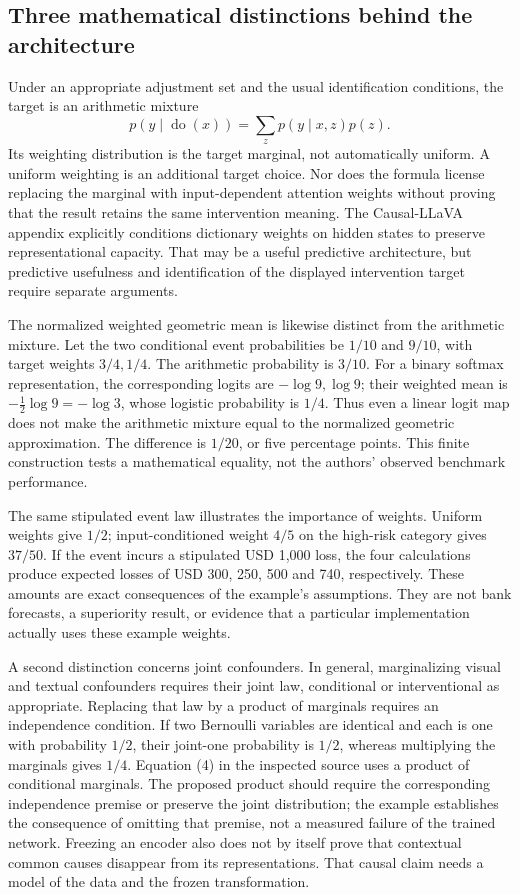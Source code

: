 \subsection{Three mathematical distinctions behind the architecture}
Under an appropriate adjustment set and the usual identification conditions, the target is an arithmetic mixture
\[
 p(y\mid\operatorname{do}(x))=\sum_z p(y\mid x,z)p(z).
\]
Its weighting distribution is the target marginal, not automatically uniform. A uniform weighting is an additional target
choice. Nor does the formula license replacing the marginal with input-dependent attention weights without proving that the
result retains the same intervention meaning. The Causal-LLaVA appendix explicitly conditions dictionary weights on hidden
states to preserve representational capacity. That may be a useful predictive architecture, but predictive usefulness and
identification of the displayed intervention target require separate arguments.\citep{exec28_fr_hu,pearl2009}

The normalized weighted geometric mean is likewise distinct from the arithmetic mixture. Let the two conditional event
probabilities be \(1/10\) and \(9/10\), with target weights \(3/4,1/4\). The arithmetic probability is \(3/10\).
For a binary softmax representation, the corresponding logits are \(-\log9,\log9\); their weighted mean is
\(-\tfrac12\log9=-\log3\), whose logistic probability is \(1/4\). Thus even a linear logit map does not make the arithmetic
mixture equal to the normalized geometric approximation. The difference is \(1/20\), or five percentage points.
This finite construction tests a mathematical equality, not the authors' observed benchmark performance.\citep{exec28_fr_reference}

The same stipulated event law illustrates the importance of weights. Uniform weights give \(1/2\); input-conditioned
weight \(4/5\) on the high-risk category gives \(37/50\). If the event incurs a stipulated USD 1,000 loss, the four
calculations produce expected losses of USD 300, 250, 500 and 740, respectively. These amounts are exact consequences of
the example's assumptions. They are not bank forecasts, a superiority result, or evidence that a particular implementation
actually uses these example weights.\citep{exec28_fr_reference}

A second distinction concerns joint confounders. In general, marginalizing visual and textual confounders requires their
joint law, conditional or interventional as appropriate. Replacing that law by a product of marginals requires an independence
condition. If two Bernoulli variables are identical and each is one with probability \(1/2\), their joint-one probability is
\(1/2\), whereas multiplying the marginals gives \(1/4\). Equation (4) in the inspected source uses a product of conditional
marginals. The proposed product should require the corresponding independence premise or preserve the joint distribution;
the example establishes the consequence of omitting that premise, not a measured failure of the trained network.
Freezing an encoder also does not by itself prove that contextual common causes disappear from its representations.
That causal claim needs a model of the data and the frozen transformation.\citep{exec28_fr_hu,exec28_fr_reference}

